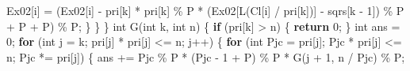 \documentclass[
]{article}
\newenvironment{Shaded}{}{}
\newcommand{\ControlFlowTok}[1]{\textcolor[rgb]{0.00,0.44,0.13}{\textbf{#1}}}
\newcommand{\DataTypeTok}[1]{\textcolor[rgb]{0.56,0.13,0.00}{#1}}
\newcommand{\DecValTok}[1]{\textcolor[rgb]{0.25,0.63,0.44}{#1}}
\newcommand{\NormalTok}[1]{#1}
\newcommand{\OperatorTok}[1]{\textcolor[rgb]{0.40,0.40,0.40}{#1}}
\begin{document}
\begin{Shaded}
\begin{Highlighting}[]
\NormalTok{                Ex02}\OperatorTok{[}\NormalTok{i}\OperatorTok{]} \OperatorTok{=} \OperatorTok{(}\NormalTok{Ex02}\OperatorTok{[}\NormalTok{i}\OperatorTok{]} \OperatorTok{{-}}\NormalTok{ pri}\OperatorTok{[}\NormalTok{k}\OperatorTok{]} \OperatorTok{*}\NormalTok{ pri}\OperatorTok{[}\NormalTok{k}\OperatorTok{]} \OperatorTok{\%}\NormalTok{ P }\OperatorTok{*} \OperatorTok{(}\NormalTok{Ex02}\OperatorTok{[}\NormalTok{L}\OperatorTok{(}\NormalTok{Cl}\OperatorTok{[}\NormalTok{i}\OperatorTok{]} \OperatorTok{/}\NormalTok{ pri}\OperatorTok{[}\NormalTok{k}\OperatorTok{])]} \OperatorTok{{-}}\NormalTok{ sqrs}\OperatorTok{[}\NormalTok{k }\OperatorTok{{-}} \DecValTok{1}\OperatorTok{])} \OperatorTok{\%}\NormalTok{ P }\OperatorTok{+}\NormalTok{ P }\OperatorTok{+}\NormalTok{ P}\OperatorTok{)} \OperatorTok{\%}\NormalTok{ P}\OperatorTok{;}
            \OperatorTok{\}}
        \OperatorTok{\}}
    \OperatorTok{\}}
    \DataTypeTok{int}\NormalTok{ G}\OperatorTok{(}\DataTypeTok{int}\NormalTok{ k}\OperatorTok{,} \DataTypeTok{int}\NormalTok{ n}\OperatorTok{)}
    \OperatorTok{\{}
        \ControlFlowTok{if} \OperatorTok{(}\NormalTok{pri}\OperatorTok{[}\NormalTok{k}\OperatorTok{]} \OperatorTok{\textgreater{}}\NormalTok{ n}\OperatorTok{)}
        \OperatorTok{\{}
            \ControlFlowTok{return} \DecValTok{0}\OperatorTok{;}
        \OperatorTok{\}}
        \DataTypeTok{int}\NormalTok{ ans }\OperatorTok{=} \DecValTok{0}\OperatorTok{;}
        \ControlFlowTok{for} \OperatorTok{(}\DataTypeTok{int}\NormalTok{ j }\OperatorTok{=}\NormalTok{ k}\OperatorTok{;}\NormalTok{ pri}\OperatorTok{[}\NormalTok{j}\OperatorTok{]} \OperatorTok{*}\NormalTok{ pri}\OperatorTok{[}\NormalTok{j}\OperatorTok{]} \OperatorTok{\textless{}=}\NormalTok{ n}\OperatorTok{;}\NormalTok{ j}\OperatorTok{++)}
        \OperatorTok{\{}
            \ControlFlowTok{for} \OperatorTok{(}\DataTypeTok{int}\NormalTok{ Pjc }\OperatorTok{=}\NormalTok{ pri}\OperatorTok{[}\NormalTok{j}\OperatorTok{];}\NormalTok{ Pjc }\OperatorTok{*}\NormalTok{ pri}\OperatorTok{[}\NormalTok{j}\OperatorTok{]} \OperatorTok{\textless{}=}\NormalTok{ n}\OperatorTok{;}\NormalTok{ Pjc }\OperatorTok{*=}\NormalTok{ pri}\OperatorTok{[}\NormalTok{j}\OperatorTok{])}
            \OperatorTok{\{}
\NormalTok{                ans }\OperatorTok{+=}\NormalTok{ Pjc }\OperatorTok{\%}\NormalTok{ P }\OperatorTok{*} \OperatorTok{(}\NormalTok{Pjc }\OperatorTok{{-}} \DecValTok{1} \OperatorTok{+}\NormalTok{ P}\OperatorTok{)} \OperatorTok{\%}\NormalTok{ P }\OperatorTok{*}\NormalTok{ G}\OperatorTok{(}\NormalTok{j }\OperatorTok{+} \DecValTok{1}\OperatorTok{,}\NormalTok{ n }\OperatorTok{/}\NormalTok{ Pjc}\OperatorTok{)} \OperatorTok{\%}\NormalTok{ P}\OperatorTok{;}

\end{Highlighting}
\end{Shaded}
\end{document}
